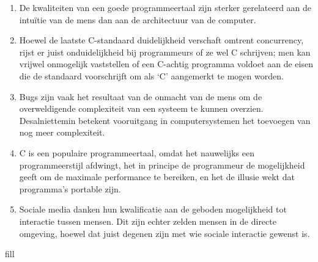 \documentclass[final,oneside,10pt]{memoir}
\def\golden{1.61803399}
\def\fillratio#1{\null\vskip 0pt plus #1fill\null}
\begin{document}
\begin{enumerate}
\item De kwaliteiten van een goede programmeertaal zijn sterker gerelateerd aan de intu\"itie van de mens dan aan de architectuur van de computer.
\item Hoewel de laatste C-standaard duidelijkheid verschaft omtrent concurrency, rijst er juist onduidelijkheid bij programmeurs of ze wel C schrijven; men kan vrijwel onmogelijk vaststellen of een C-achtig programma voldoet aan de eisen die de standaard voorschrijft om als `C' aangemerkt te mogen worden.
\item Bugs zijn vaak het resultaat van de onmacht van de mens om de overweldigende complexiteit van een systeem te kunnen overzien.
	Desalniettemin betekent vooruitgang in computersystemen het toevoegen van nog meer complexiteit.
\item C is een populaire programmeertaal, omdat het nauwelijks een programmeerstijl afdwingt, het in principe de programmeur de mogelijkheid geeft om de maximale performance te bereiken, en het de illusie wekt dat programma's portable zijn.

\item Sociale media danken hun kwalificatie aan de geboden mogelijkheid tot interactie tussen mensen.
	Dit zijn echter zelden mensen in de directe omgeving, hoewel dat juist degenen zijn met wie sociale interactie gewenst is.
\end{enumerate}
\fillratio{\golden}
\end{document}
